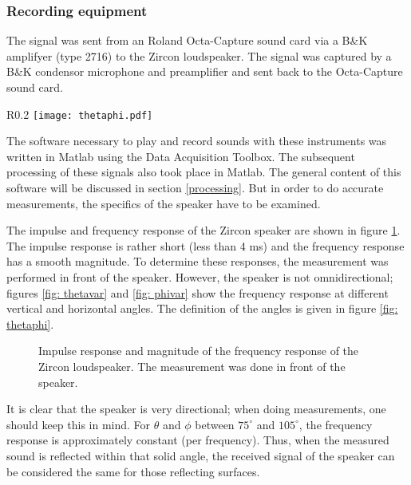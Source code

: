 \subsubsection{Recording equipment}
The signal was sent from an Roland Octa-Capture sound card via a B\&K amplifyer (type 2716) to the Zircon loudspeaker. The signal was captured by a B\&K condensor microphone and preamplifier and sent back to the Octa-Capture sound card.

\begin{wrapfigure}{R}{0.2\textwidth}
  \centering
    \texttt{[image: thetaphi.pdf]}
  \caption{Definition of angles $\theta$ and $\phi$.}
  \label{fig: thetaphi}
\end{wrapfigure}

The software necessary to play and record sounds with these instruments was written in Matlab using the Data Acquisition Toolbox. The subsequent processing of these signals also took place in Matlab. The general content of this software will be discussed in section \ref{processing}. But in order to do accurate measurements, the specifics of the speaker have to be examined.

The impulse and frequency response of the Zircon speaker are shown in figure \ref{fig: ZirconImp}. The impulse response is rather short (less than 4 ms) and the frequency response has a smooth magnitude. To determine these responses, the measurement was performed in front of the speaker. However, the speaker is not omnidirectional; figures \ref{fig: thetavar} and \ref{fig: phivar} show the frequency response at different vertical and horizontal angles. The definition of the angles is given in figure \ref{fig: thetaphi}. 
\begin{figure}[h!]
  \centering
  \caption{Impulse response and magnitude of the frequency response of the Zircon loudspeaker. The measurement was done in front of the speaker. }
  \label{fig: ZirconImp}
\end{figure}


It is clear that the speaker is very directional; when doing measurements, one should keep this in mind. For $\theta$ and $\phi$ between $75^{\circ}$ and $105^{\circ}$, the frequency response is approximately constant (per frequency). Thus, when the measured sound is reflected within that solid angle, the received signal of the speaker can be considered the same for those reflecting surfaces.

